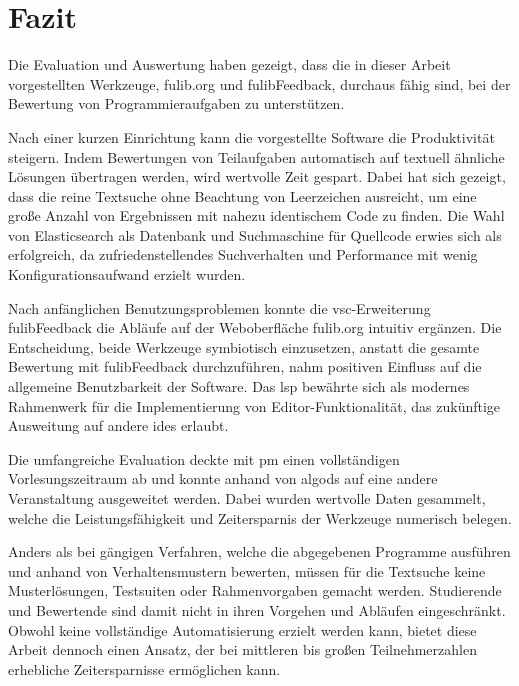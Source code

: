 \chapter{Fazit}\label{ch:conclusion}

Die Evaluation und Auswertung haben gezeigt, dass die in dieser Arbeit vorgestellten Werkzeuge, fulib.org und fulibFeedback, durchaus fähig sind, bei der Bewertung von Programmieraufgaben zu unterstützen.

Nach einer kurzen Einrichtung kann die vorgestellte Software die Produktivität steigern.
Indem Bewertungen von Teilaufgaben automatisch auf textuell ähnliche Lösungen übertragen werden, wird wertvolle Zeit gespart.
Dabei hat sich gezeigt, dass die reine Textsuche ohne Beachtung von Leerzeichen ausreicht, um eine große Anzahl von Ergebnissen mit nahezu identischem Code zu finden.
Die Wahl von Elasticsearch als Datenbank und Suchmaschine für Quellcode erwies sich als erfolgreich, da zufriedenstellendes Suchverhalten und Performance mit wenig Konfigurationsaufwand erzielt wurden.

Nach anfänglichen Benutzungsproblemen konnte die \ac{vsc}-Erweiterung fulibFeedback die Abläufe auf der Weboberfläche fulib.org intuitiv ergänzen.
Die Entscheidung, beide Werkzeuge symbiotisch einzusetzen, anstatt die gesamte Bewertung mit fulibFeedback durchzuführen, nahm positiven Einfluss auf die allgemeine Benutzbarkeit der Software.
Das \acl{lsp} bewährte sich als modernes Rahmenwerk für die Implementierung von Editor-Funktionalität, das zukünftige Ausweitung auf andere \acp{ide} erlaubt.

Die umfangreiche Evaluation deckte mit \ac{pm} einen vollständigen Vorlesungszeitraum ab und konnte anhand von \acl{algods} auf eine andere Veranstaltung ausgeweitet werden.
Dabei wurden wertvolle Daten gesammelt, welche die Leistungsfähigkeit und Zeitersparnis der Werkzeuge numerisch belegen.

Anders als bei gängigen Verfahren, welche die abgegebenen Programme ausführen und anhand von Verhaltensmustern bewerten, müssen für die Textsuche keine Musterlösungen, Testsuiten oder Rahmenvorgaben gemacht werden.
Studierende und Bewertende sind damit nicht in ihren Vorgehen und Abläufen eingeschränkt.
Obwohl keine vollständige Automatisierung erzielt werden kann, bietet diese Arbeit dennoch einen Ansatz, der bei mittleren bis großen Teilnehmerzahlen erhebliche Zeitersparnisse ermöglichen kann.
